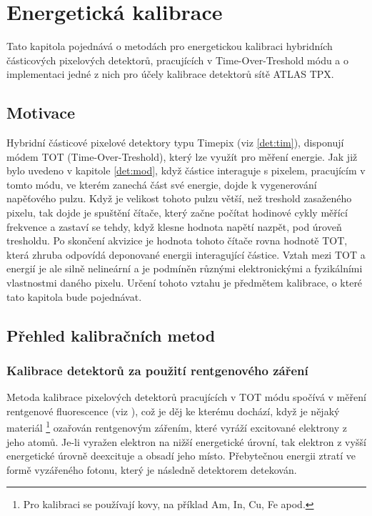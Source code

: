 

\chapter{Energetická kalibrace}\label{calib}
Tato kapitola pojednává o metodách pro energetickou kalibraci hybridních částicových pixelových detektorů, pracujících v Time-Over-Treshold módu a o implementaci jedné z nich pro účely kalibrace detektorů sítě ATLAS TPX.

\section{Motivace}
Hybridní částicové pixelové detektory typu Timepix (viz \ref{det:tim}), disponují módem TOT (Time-Over-Treshold), který lze využít pro měření energie. Jak již bylo uvedeno v kapitole \ref{det:mod}, když částice interaguje s pixelem, pracujícím v tomto módu, ve kterém zanechá část své energie, dojde k vygenerování napěťového pulzu. Když je velikost tohoto pulzu větší, než treshold zasaženého pixelu, tak dojde je spuštění čítače, který začne počítat hodinové cykly měřící frekvence a zastaví se tehdy, když klesne hodnota napětí nazpět, pod úroveň tresholdu. Po skončení akvizice je hodnota tohoto čítače rovna hodnotě TOT, která zhruba odpovídá deponované energii interagující částice. Vztah mezi TOT a energií je ale silně nelineární a je podmíněn různými elektronickými a fyzikálními vlastnostmi daného pixelu. Určení tohoto vztahu je předmětem kalibrace, o které tato kapitola bude pojednávat.

\section{Přehled kalibračních metod}

\subsection{Kalibrace detektorů za použití rentgenového záření}
Metoda kalibrace pixelových detektorů pracujících v TOT módu \cite{Jakubek2011S262} spočívá v měření rentgenové fluorescence (viz \cite{Jakubek-radiography_and_charge_sharing}),
což je děj ke kterému dochází, když je nějaký materiál 
\footnote{Pro kalibraci se používají kovy, na příklad Am, In, Cu, Fe apod.}
ozařován rentgenovým zářením, které vyráží excitované elektrony z jeho atomů. Je-li vyražen elektron na nižší energetické úrovní, tak elektron z vyšší energetické úrovně deexcituje a obsadí jeho místo. Přebytečnou energii ztratí ve formě vyzářeného fotonu, který je následně detektorem detekován. 


